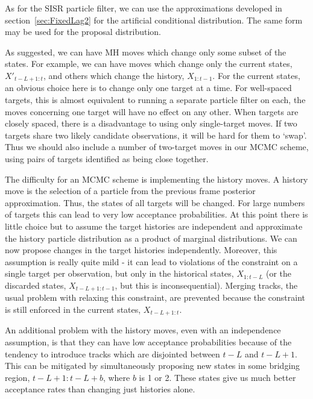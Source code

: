 As for the SISR particle filter, we can use the approximations developed in section~\ref{sec:FixedLag2} for the artificial conditional distribution. The same form may be used for the proposal distribution.

As suggested, we can have MH moves which change only some subset of the states. For example, we can have moves which change only the current states, $X'_{t-L+1:t}$, and others which change the history, $X_{1:t-1}$. For the current states, an obvious choice here is to change only one target at a time. For well-spaced targets, this is almost equivalent to running a separate particle filter on each, the moves concerning one target will have no effect on any other. When targets are closely spaced, there is a disadvantage to using only single-target moves. If two targets share two likely candidate observations, it will be hard for them to `swap'. Thus we should also include a number of two-target moves in our MCMC scheme, using pairs of targets identified as being close together.

The difficulty for an MCMC scheme is implementing the history moves. A history move is the selection of a particle from the previous frame posterior approximation. Thus, the states of all targets will be changed. For large numbers of targets this can lead to very low acceptance probabilities. At this point there is little choice but to assume the target histories are independent and approximate the history particle distribution as a product of marginal distributions. We can now propose changes in the target histories independently. Moreover, this assumption is really quite mild - it can lead to violations of the constraint on a single target per observation, but only in the historical states, $X_{1:t-L}$ (or the discarded states, $X_{t-L+1:t-1}$, but this is inconsequential). Merging tracks, the usual problem with relaxing this constraint, are prevented because the constraint is still enforced in the current states, $X_{t-L+1:t}$.

An additional problem with the history moves, even with an independence assumption, is that they can have low acceptance probabilities because of the tendency to introduce tracks which are disjointed between $t-L$ and $t-L+1$. This can be mitigated by simultaneously proposing new states in some bridging region, $t-L+1:t-L+b$, where $b$ is 1 or 2. These states give us much better acceptance rates than changing just histories alone.



